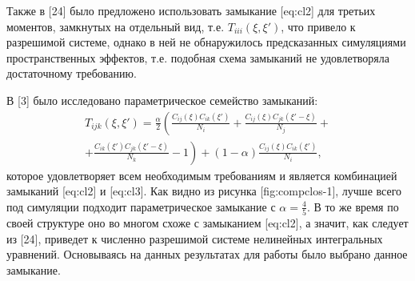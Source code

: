 Также в [24] было предложено использовать замыкание [eq:cl2] для третьих моментов, замкнутых на отдельный вид, т.е. $ T_{iii}(\xi,\xi') $, что привело к разрешимой системе, однако в ней не обнаружилось предсказанных симуляциями пространственных эффектов, т.е. подобная схема замыканий не удовлетворяла достаточному требованию.

В [3] было исследовано параметрическое семейство замыканий:
\begin{multline}\label{eq:closure}
T_{ijk}(\xi,\xi')	=	\frac{\alpha}{2}\left(\frac{C_{ij}(\xi)C_{ik}(\xi')}{N_{i}}+\frac{C_{ij}(\xi)C_{jk}(\xi'-\xi)}{N_{j}}+\right.\\ 
\left.+\frac{C_{ik}(\xi')C_{jk}(\xi'-\xi)}{N_{k}}-1\right)+(1-\alpha)\frac{C_{ij}(\xi)C_{ik}(\xi')}{N_{i}},
\end{multline}
которое удовлетворяет всем необходимым требованиям и является комбинацией замыканий [eq:cl2] и [eq:cl3]. Как видно из рисунка [fig:compclos-1], лучше всего под симуляции подходит параметрическое замыкание с $ \alpha=\frac{4}{5} $. В то же время по своей структуре оно во многом схоже с замыканием [eq:cl2], а значит, как следует из [24], приведет к численно разрешимой системе нелинейных интегральных уравнений. Основываясь на данных результатах для работы было выбрано данное замыкание.